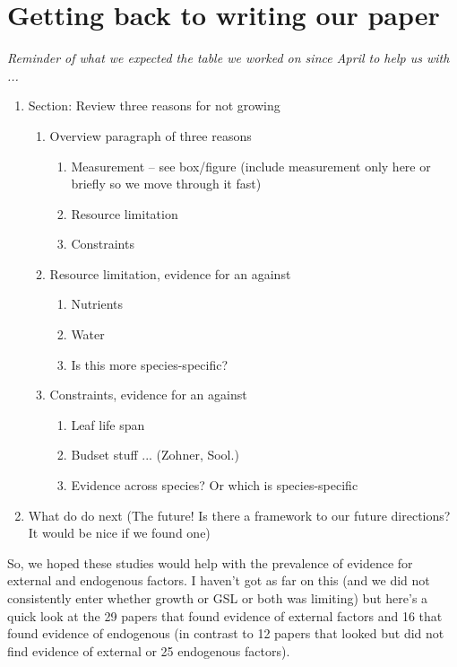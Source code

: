 \documentclass[11pt]{article}
\begin{document}
\section{Getting back to writing our paper}

\emph{Reminder of what we expected the table we worked on since April to help us with ...}
\begin{enumerate}
\item Section: Review three reasons for not growing 
\begin{enumerate} 
\item Overview paragraph of three reasons
\begin{enumerate} 
\item Measurement -- see box/figure  (include measurement only here or briefly so we move through it fast)
\item Resource limitation
\item Constraints
\end{enumerate}
\item Resource limitation, evidence for an against 
\begin{enumerate}
\item Nutrients
\item Water
\item Is this more species-specific?
\end{enumerate}
\item Constraints, evidence for an against 
\begin{enumerate}
\item Leaf life span
\item Budset stuff ... (Zohner, Sool.)
\item Evidence across species? Or which is species-specific
\end{enumerate}
\end{enumerate}
\item What do do next (The future! Is there a framework to our future directions? It would be nice if we found one) 
\end{enumerate}

\vspace{5ex}
So, we hoped these studies would help with the prevalence of evidence for external and endogenous factors. I haven't got as far on this (and we did not consistently enter whether growth or GSL or both was limiting) but here's a quick look at the 29 papers that found evidence of external factors and 16 that found evidence of endogenous (in contrast to 12 papers that looked but did not find evidence of external or 25 endogenous factors).
\end{document}
